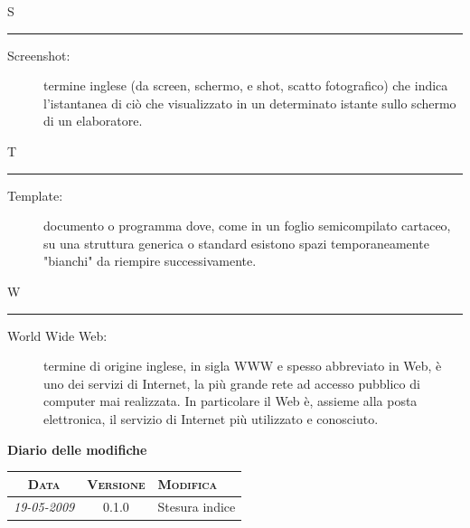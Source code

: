 \documentclass[11pt,a4paper]{article}
\newcommand{\modifiche} 
{
\newpage
\begin{center}
\textbf{Diario delle modifiche} \\
\bigskip
\begin{tabular}{|c|c|p{0.62\textwidth}|}
\hline
\textsc{Data} & \textsc{Versione} & \textsc{Modifica} \\
\hline
\hline
\textit{19-05-2009} & 0.1.0 & Stesura indice\\
\hline
\end{tabular}
\end{center}
}
\begin{document}
\bigskip
\Huge S \bigskip
\hrule
\smallskip
\normalsize
\begin{description}
	\item[Screenshot:] termine inglese (da screen, schermo, e shot, scatto fotografico) che indica l'istantanea di ciò che visualizzato in un determinato istante sullo schermo di un elaboratore.
\end{description}
\bigskip
\Huge T \bigskip
\hrule
\smallskip
\normalsize
\begin{description}
	\item[Template:] documento o programma dove, come in un foglio semicompilato cartaceo, su una struttura generica o standard esistono spazi temporaneamente "bianchi" da riempire successivamente.
\end{description}
\bigskip
\Huge W \bigskip
\hrule
\smallskip
\normalsize
\begin{description}
	\item[World Wide Web:] termine di origine inglese, in sigla WWW e spesso abbreviato in Web, è uno dei servizi di Internet, la più grande rete ad accesso pubblico di computer mai realizzata. In particolare il Web è, assieme alla posta elettronica, il servizio di Internet più utilizzato e conosciuto.
\end{description}
\modifiche
\end{document}

